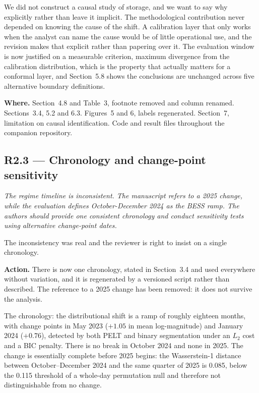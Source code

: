 \documentclass[11pt,a4paper]{article}
\newenvironment{revcomment}
  {\begin{mdframed}[backgroundcolor=quotebg,linecolor=quoterule,linewidth=0.4pt,
    innertopmargin=6pt,innerbottommargin=6pt,skipabove=8pt,skipbelow=8pt]\itshape}
  {\end{mdframed}}
\newcommand{\action}[1]{\textbf{Action.} #1}
\newcommand{\where}[1]{\textbf{Where.} #1}
\begin{document}
We did not construct a causal study of storage, and we want to say why explicitly rather than leave it implicit. The methodological contribution never depended on knowing the cause of the shift. A calibration layer that only works when the analyst can name the cause would be of little operational use, and the revision makes that explicit rather than papering over it. The evaluation window is now justified on a measurable criterion, maximum divergence from the calibration distribution, which is the property that actually matters for a conformal layer, and Section~5.8 shows the conclusions are unchanged across five alternative boundary definitions.

\where{Section~4.8 and Table~3, footnote removed and column renamed. Sections~3.4, 5.2 and 6.3. Figures~5 and 6, labels regenerated. Section~7, limitation on causal identification. Code and result files throughout the companion repository.}

\subsection*{R2.3 --- Chronology and change-point sensitivity}

\begin{revcomment}
The regime timeline is inconsistent. The manuscript refers to a 2025 change, while the evaluation defines October-December 2024 as the BESS ramp. The authors should provide one consistent chronology and conduct sensitivity tests using alternative change-point dates.
\end{revcomment}

The inconsistency was real and the reviewer is right to insist on a single chronology.

\action{There is now one chronology, stated in Section~3.4 and used everywhere without variation, and it is regenerated by a versioned script rather than described. The reference to a 2025 change has been removed: it does not survive the analysis.}

The chronology: the distributional shift is a ramp of roughly eighteen months, with change points in May 2023 ($+1.05$ in mean log-magnitude) and January 2024 ($+0.76$), detected by both PELT and binary segmentation under an $L_2$ cost and a BIC penalty. There is no break in October 2024 and none in 2025. The change is essentially complete before 2025 begins: the Wasserstein-1 distance between October--December 2024 and the same quarter of 2025 is 0.085, below the 0.115 threshold of a whole-day permutation null and therefore not distinguishable from no change.
\end{document}

